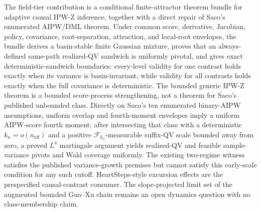 The field-tier contribution is a conditional finite-attractor theorem bundle for adaptive causal IPW-Z inference, together with a direct repair of Saco's enumerated AIPW/DML theorem.  Under common score, derivative, Jacobian, policy, covariance, root-separation, attraction, and local-root envelopes, the bundle derives a basin-stable finite Gaussian mixture, proves that an always-defined same-path realized-QV sandwich is uniformly pivotal, and gives exact deterministic-sandwich boundaries: every-level validity for one contrast holds exactly when its variance is basin-invariant, while validity for all contrasts holds exactly when the full covariance is deterministic.  The bounded generic IPW-Z theorem is a bounded score-process strengthening, not a theorem for Saco's published unbounded class.  Directly on Saco's ten enumerated binary-AIPW assumptions, uniform overlap and fourth-moment envelopes imply a uniform AIPW-score fourth moment; after intersecting that class with a deterministic \(k_n=o(n_{\mathrm{eff}})\) and a positive \(\mathcal F_{k_n}\)-measurable suffix-QV scale bounded away from zero, a proved \(L^4\) martingale argument yields realized-QV and feasible sample-variance pivots and Wald coverage uniformly.  The existing two-regime witness satisfies the published variance-growth premises but cannot satisfy this early-scale condition for any such cutoff.  HeartSteps-style excursion effects are the prespecified causal-contrast consumer.  The slope-projected limit set of the augmented bounded Guo--Xu chain remains an open dynamics question with no class-membership claim.